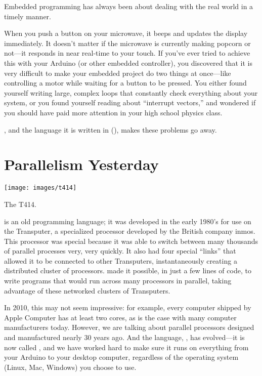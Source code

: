 Embedded programming has always been about dealing with the real world in a timely manner.

When you push a button on your microwave, it beeps and updates the display immediately. It doesn't matter if the microwave is currently making popcorn or not---it responds in near real-time to your touch. If you've ever tried to achieve this with your Arduino (or other embedded controller), you discovered that it is very difficult to make your embedded project do two things at once---like controlling a motor while waiting for a button to be pressed. You either found yourself writing large, complex loops that constantly check everything about your system, or you found yourself reading about ``interrupt vectors,'' and wondered if you should have paid more attention in your high school physics class.

\plumbing, and the language it is written in (\occam), makes these problems go away.

\newpage

\section*{Parallelism Yesterday}
\begin{floatingfigure}[r]{0.4\linewidth}
	  \begin{center}
    	\texttt{[image: images/t414]}
			\captionsetup{labelformat=empty,justification=centering}
   		\caption{The T414.}
    	\label{image:t414}
  \end{center}
\end{floatingfigure}


\justoccam is an old programming language; it was developed in the early 1980's for use on the Transputer, a specialized processor developed by the British company inmos. This processor was special because it was able to switch between many thousands of parallel processes very, very quickly. It also had four special ``links'' that allowed it to be connected to other Transputers, instantaneously creating a distributed cluster of processors. \justoccam made it possible, in just a few lines of code, to write programs that would run across many processors in parallel, taking advantage of these networked clusters of Transputers.

In 2010, this may not seem impressive: for example, every computer shipped by Apple Computer has at least two cores, as is the case with many computer manufacturers today. However, we are talking about {\strong parallel processors designed and manufactured nearly 30 years ago}. And the language, \justoccam, has evolved---it is now called \occam, and we have worked hard to make sure it runs on everything from your Arduino to your desktop computer, regardless of the operating system (Linux, Mac, Windows) you choose to use.


